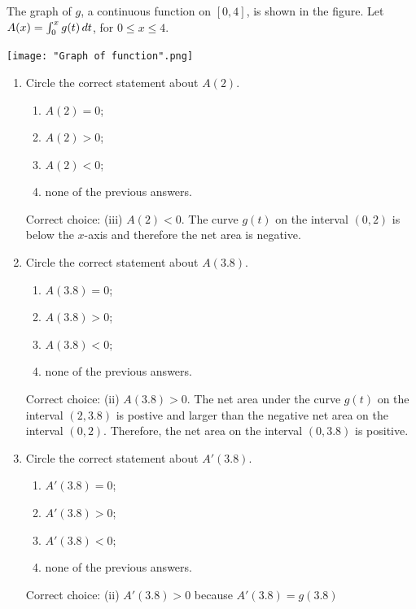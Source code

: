 \documentclass[nooutcomes,handout]{ximera}
\begin{document}
\begin{problem}
  The graph of $g$, a continuous function on $[0, 4]$, is shown in the figure.
  Let $A(x) = \int_{0}^x g(t) \,d t$, for $0 \le x \le 4$.
  \begin{image}
    \texttt{[image: "Graph of function".png]}
  \end{image}
  \begin{enumerate}
  
    \item
      Circle the correct statement about $A(2)$.
      \begin{enumerate}
        \item $A(2) = 0$;
        \item $A(2) > 0$;
        \item $A(2) < 0$;
        \item none of the previous answers.
      \end{enumerate}
      \begin{freeResponse}
        Correct choice: (iii) $A(2) < 0$.  The curve $g(t)$ on the interval $(0,2)$ is below the $x$-axis and therefore the net area is negative.
      \end{freeResponse}
      
      
    \item
      Circle the correct statement about $A(3.8)$.
      \begin{enumerate}
        \item $A(3.8) = 0$;
        \item $A(3.8) > 0$;
        \item $A(3.8) < 0$;
        \item none of the previous answers.
      \end{enumerate}
      \begin{freeResponse}
        Correct choice: (ii) $A(3.8) > 0$.  The net area under the curve $g(t)$ on the interval $(2,3.8)$ is postive and larger than the negative net area on the interval $(0,2)$.  Therefore, the net area on the interval $(0,3.8)$ is positive.
      \end{freeResponse}

    \item
      Circle the correct statement about $A'(3.8)$.
      \begin{enumerate}
        \item $A'(3.8) = 0$;
        \item $A'(3.8) > 0$;
        \item $A'(3.8) < 0$;
        \item none of the previous answers.
      \end{enumerate}
      \begin{freeResponse}
        Correct choice: (ii) $A'(3.8) > 0$ because $A'(3.8)=g(3.8)$
      \end{freeResponse}


\end{enumerate}
\end{problem}
\end{document}
